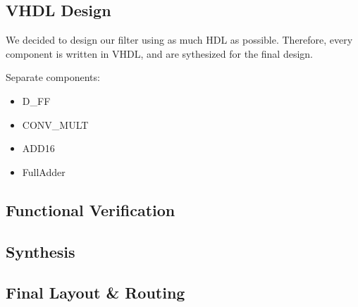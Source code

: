 \subsection{VHDL Design}
We decided to design our filter using as much HDL as possible.  Therefore, every component is written in VHDL, and are sythesized for the final design.


Separate components:
\begin{itemize}
\item D\_FF
\item CONV\_MULT
\item ADD16
\item FullAdder
\end{itemize}

\subsection{Functional Verification}



\subsection{Synthesis}



\subsection{Final Layout \& Routing}

